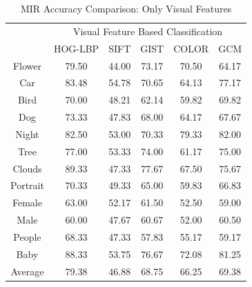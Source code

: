 \newpage


\begin{table}
\centering
\caption{ MIR Accuracy Comparison: Only Visual Features} %
\vspace*{0.2 cm}
\begin{tabular}{| c | c | c | c | c | c |}
\hline
 {\multirow{2}{*}{Labels}} & \multicolumn{5}{|c|}{Visual Feature Based Classification} \\ 
 \cline{2-6}
 & HOG-LBP & SIFT & GIST & COLOR & GCM \\ [1ex] \hline
Flower & 79.50 & 44.00 & 73.17 & 70.50 & 64.17 \\  [1ex] \hline
Car & 83.48 & 54.78 & 70.65 & 64.13 & 77.17 \\  [1ex] \hline
Bird & 70.00 & 48.21 & 62.14 & 59.82 & 69.82 \\  [1ex] \hline
Dog & 73.33 & 47.83 & 68.00 & 64.17 & 67.67 \\  [1ex] \hline
Night & 82.50 & 53.00 & 70.33 & 79.33 & 82.00 \\  [1ex] \hline
Tree & 77.00 & 53.33 & 74.00 & 61.17 & 75.00 \\  [1ex] \hline
Clouds & 89.33 & 47.33 & 77.67 & 67.50 & 75.67 \\  [1ex] \hline
Portrait & 70.33 & 49.33 & 65.00 & 59.83 & 66.83 \\  [1ex] \hline
Female & 63.00 & 52.17 & 61.50 & 52.50 & 59.00 \\  [1ex] \hline
Male & 60.00 & 47.67 & 60.67 & 52.00 & 60.50 \\  [1ex] \hline
People & 68.33 & 47.33 & 57.83 & 55.17 & 59.17 \\  [1ex] \hline
Baby & 88.33 & 53.75 & 76.67 & 72.08 & 81.25 \\  [1ex] \hline
Average & 79.38 & 46.88 & 68.75 & 66.25 & 69.38 \\  [1ex] \hline
\end{tabular}
\label{MIRAccuracyVisual} %
\end{table}

